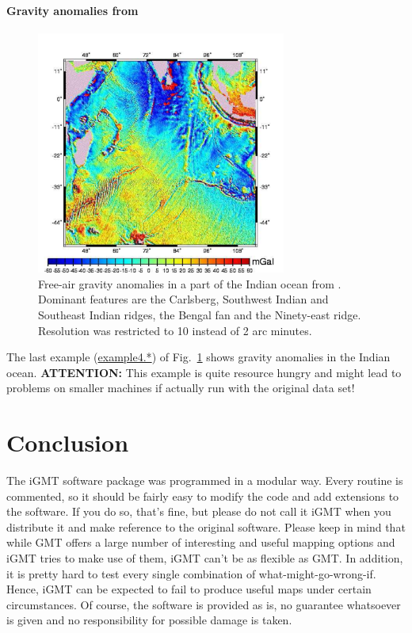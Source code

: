 \documentclass[11pt]{article}
\begin{document}
\paragraph{Gravity anomalies from \cite{sandwell97}}
\begin{figure}
\centerline{\includegraphics[height=8cm]{./examples/example4}}
\caption{Free-air gravity anomalies in a part of the Indian ocean from
  \cite{sandwell97}. Dominant features are the Carlsberg, 
  Southwest Indian and Southeast Indian ridges, the Bengal fan and the
  Ninety-east ridge. Resolution was restricted to 10 instead of 2 arc minutes.
  \label{fig4}}
\end{figure}
The last example (\url{example4.*}) of Fig.~\ref{fig4} shows gravity
anomalies in the Indian ocean. {\bf ATTENTION:} This example is quite
resource hungry and might lead to problems on smaller machines if
actually run with the original data set!

\clearpage
\section{Conclusion}

The iGMT software package was programmed in a modular way. Every
routine is commented, so it should be fairly easy to modify the code
and add extensions to the software. If you do so, that's fine, but
please do not call it iGMT when you distribute it and make reference
to the original software. Please keep in mind that while GMT offers a
large number of interesting and useful mapping options and iGMT tries
to make use of them, iGMT can't be as flexible as GMT. In addition, it
is pretty hard to test every single combination of
what-might-go-wrong-if. Hence, iGMT can be expected to fail to produce
useful maps under certain circumstances. Of course, the software is
provided as is, no guarantee whatsoever is given and no responsibility
for possible damage is taken.
\end{document}

